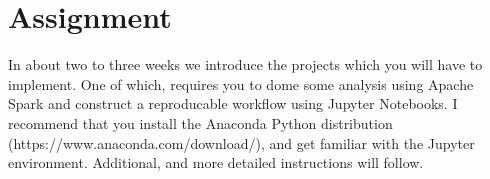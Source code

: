 \section{Assignment}
\label{sec:assignment}

In about two to three weeks we introduce the projects which you will have to implement. One of which, requires you to dome some analysis using Apache Spark and construct a reproducable workflow using Jupyter Notebooks. I recommend that you install the Anaconda Python distribution (https://www.anaconda.com/download/), and get familiar with the Jupyter environment. Additional, and more detailed instructions will follow.


